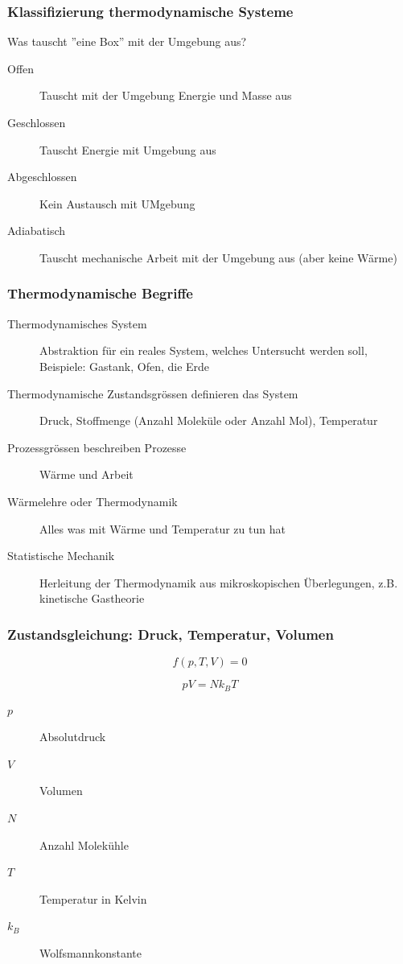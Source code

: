 \documentclass[a4paper]{scrartcl}
\begin{document}
\subsubsection{Klassifizierung thermodynamische Systeme}

Was tauscht ''eine Box'' mit der Umgebung aus?


\begin{description}
	\item[Offen] Tauscht mit der Umgebung Energie und Masse aus
	\item[Geschlossen] Tauscht Energie mit Umgebung aus
	\item[Abgeschlossen] Kein Austausch mit UMgebung
	\item[Adiabatisch] Tauscht mechanische Arbeit mit der Umgebung aus (aber keine Wärme)
\end{description}

\subsubsection{Thermodynamische Begriffe}

\begin{description}
	\item[Thermodynamisches System] Abstraktion für ein reales System, welches Untersucht werden soll, Beispiele: Gastank, Ofen, die Erde
	\item[Thermodynamische Zustandsgrössen definieren das System] Druck, Stoffmenge (Anzahl Moleküle oder Anzahl Mol), Temperatur
	\item[Prozessgrössen beschreiben Prozesse] Wärme und Arbeit
	\item[Wärmelehre oder Thermodynamik] Alles was mit Wärme und Temperatur zu tun hat
	\item[Statistische Mechanik] Herleitung der Thermodynamik aus mikroskopischen Überlegungen, z.B. kinetische Gastheorie
\end{description}


\subsubsection{Zustandsgleichung: Druck, Temperatur, Volumen}


\[
	f(p, T, V) = 0
\]



\[
p V = N k_B T
\]


\begin{description}
	\item[$p$] Absolutdruck
	\item[$V$] Volumen	
	\item[$N$] Anzahl Molekühle
	\item[$T$] Temperatur in Kelvin
	\item[$k_B$] Wolfsmannkonstante
\end{description}
\end{document}
